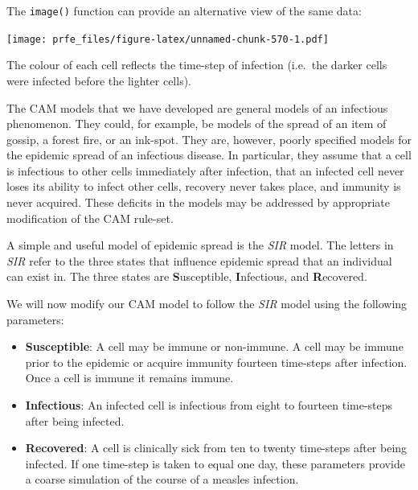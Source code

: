 \documentclass[12pt,a4paper]{book}
\newenvironment{Shaded}{\begin{snugshade}}{\end{snugshade}}
\newcommand{\KeywordTok}[1]{\textcolor[rgb]{0.13,0.29,0.53}{\textbf{#1}}}
\newcommand{\DataTypeTok}[1]{\textcolor[rgb]{0.13,0.29,0.53}{#1}}
\newcommand{\OtherTok}[1]{\textcolor[rgb]{0.56,0.35,0.01}{#1}}
\newcommand{\OperatorTok}[1]{\textcolor[rgb]{0.81,0.36,0.00}{\textbf{#1}}}
\newcommand{\NormalTok}[1]{#1}
\theoremstyle{definition}
\theoremstyle{definition}
\theoremstyle{definition}
\theoremstyle{remark}
\begin{document}
The \texttt{image()} function can provide an alternative view of the
same data:

\begin{Shaded}
\end{Shaded}

\texttt{[image: prfe\_files/figure-latex/unnamed-chunk-570-1.pdf]}

The colour of each cell reflects the time-step of infection (i.e.~the
darker cells were infected before the lighter cells).

The CAM models that we have developed are general models of an
infectious phenomenon. They could, for example, be models of the spread
of an item of gossip, a forest fire, or an ink-spot. They are, however,
poorly specified models for the epidemic spread of an infectious
disease. In particular, they assume that a cell is infectious to other
cells immediately after infection, that an infected cell never loses its
ability to infect other cells, recovery never takes place, and immunity
is never acquired. These deficits in the models may be addressed by
appropriate modification of the CAM rule-set.

A simple and useful model of epidemic spread is the \emph{SIR} model.
The letters in \emph{SIR} refer to the three states that influence
epidemic spread that an individual can exist in. The three states are
\textbf{S}usceptible, \textbf{I}nfectious, and \textbf{R}ecovered.

We will now modify our CAM model to follow the \emph{SIR} model using
the following parameters:

\begin{itemize}
\item
  \textbf{Susceptible}: A cell may be immune or non-immune. A cell may
  be immune prior to the epidemic or acquire immunity fourteen
  time-steps after infection. Once a cell is immune it remains immune.
\item
  \textbf{Infectious}: An infected cell is infectious from eight to
  fourteen time-steps after being infected.
\item
  \textbf{Recovered}: A cell is clinically sick from ten to twenty
  time-steps after being infected. If one time-step is taken to equal
  one day, these parameters provide a coarse simulation of the course of
  a measles infection.
\end{itemize}
\end{document}
